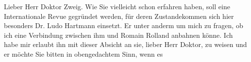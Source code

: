 \pstart\center{}Lieber Herr Doktor Zweig.\pend\vspace{0.5em}
\pstart
           Wie Sie vielleicht schon erfahren haben, soll eine Internationale Revue gegründet
               werden, für deren Zustandekommen sich hier besonders Dr. Ludo Hartmann einsetzt. Er \label{K_L03776-1v}\label{K_L03776-1} unter anderm um mich zu fragen, ob ich
               eine Verbindung zwischen ihm und Romain
                  Rolland anbahnen könne. Ich habe mir erlaubt ihn mit dieser Absicht an sie,
               lieber Herr Doktor, zu weisen und er möchte Sie bitten in obengedachtem Sinn, wenn es
